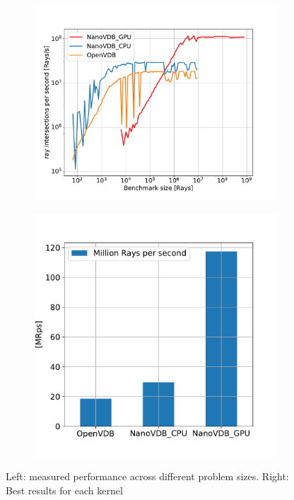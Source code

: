 \begin{figure}[h]
    \begin{subfigure}{0.5\textwidth}
    \includegraphics[width=1\linewidth]{res/results.pdf} 
    
\end{subfigure}
    \begin{subfigure}{0.4\textwidth}
    \includegraphics[width=1\linewidth]{res/barplot.pdf}
\end{subfigure}

\caption{Left: measured performance across different problem sizes. Right: Best results for each kernel}
\label{fig:results}
\end{figure}